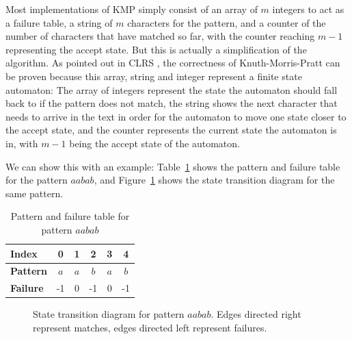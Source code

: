 \documentclass[ %
                    author={Dominic Joseph Moylett},
                    degree={MEng},
                     title={Dictionary Matching with Fingerprints},
                  subtitle={An Empirical Analysis},
                      type={research},
                      year={2015} ]{dissertation}
\begin{document}
Most implementations of KMP simply consist of an array of $m$ integers to act as a failure table, a string of $m$ characters for the pattern, and a counter of the number of characters that have matched so far, with the counter reaching $m - 1$ representing the accept state. But this is actually a simplification of the algorithm. As pointed out in CLRS \cite{clrs:kmp}, the correctness of Knuth-Morris-Pratt can be proven because this array, string and integer represent a finite state automaton: The array of integers represent the state the automaton should fall back to if the pattern does not match, the string shows the next character that needs to arrive in the text in order for the automaton to move one state closer to the accept state, and the counter represents the current state the automaton is in, with $m - 1$ being the accept state of the automaton.

We can show this with an example: Table~\ref{tab:kmp-pattern-failure} shows the pattern and failure table for the pattern $aabab$, and Figure~\ref{fig:kmp-pattern-failure} shows the state transition diagram for the same pattern.

\begin{table}[t]
  \centering
  \begin{tabular}{|l|c|c|c|c|c|}
    \hline
    \textbf{Index} & 0 & 1 & 2 & 3 & 4 \\\hline
    \textbf{Pattern} & $a$ & $a$ & $b$ & $a$ & $b$ \\\hline
    \textbf{Failure} & -1 & 0 & -1 & 0 & -1\\\hline
  \end{tabular}
  \caption{Pattern and failure table for pattern $aabab$}
  \label{tab:kmp-pattern-failure}
\end{table}

\begin{figure}[t]
  \centering
  \caption{State transition diagram for pattern $aabab$. Edges directed right represent matches, edges directed left represent failures.}
  \label{fig:kmp-pattern-failure}
\end{figure}
\end{document}
